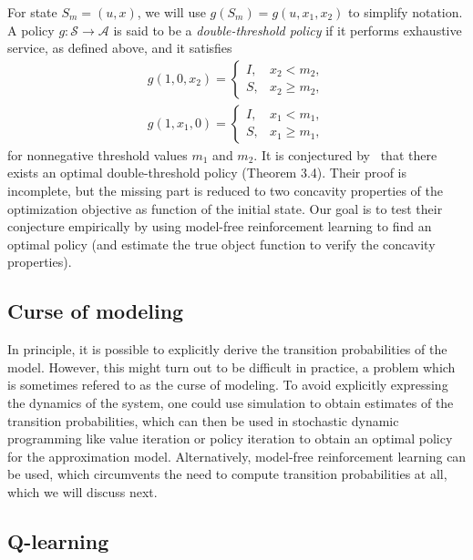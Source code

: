 \documentclass{article}
\theoremstyle{definition}
\theoremstyle{plain}
\begin{document}
For state $S_{m} = (u, x)$, we will use $g(S_{m}) = g(u, x_{1}, x_{2})$ to
simplify notation. A policy $g : \mathcal{S} \rightarrow \mathcal{A}$ is said to
be a \textit{double-threshold policy} if it performs exhaustive service, as
defined above, and it satisfies
\begin{align}
  g(1, 0, x_{2}) = \begin{cases}
                     I, & x_{2} < m_{2} , \\
                     S, & x_{2} \geq m_{2} ,
                    \end{cases}
\end{align}
\begin{align}
  g(1, x_{1}, 0) = \begin{cases}
                     I, & x_{1} < m_{1} , \\
                     S, & x_{1} \geq m_{1} ,
                    \end{cases}
\end{align}
for nonnegative threshold values $m_{1}$ and $m_{2}$. It is conjectured
by~\cite{hofriOptimalControlTwo1987} that there exists an optimal
double-threshold policy (Theorem 3.4). Their proof is incomplete, but the
missing part is reduced to two concavity properties of the optimization
objective as function of the initial state. Our goal is to test their conjecture
empirically by using model-free reinforcement learning to find an optimal policy
(and estimate the true object function to verify the concavity properties).


\subsection{Curse of modeling}

In principle, it is possible to explicitly derive the transition probabilities
of the model. However, this might turn out to be difficult in practice, a
problem which is sometimes refered to as the curse of modeling. To avoid
explicitly expressing the dynamics of the system, one could use simulation to
obtain estimates of the transition probabilities, which can then be used in
stochastic dynamic programming like value iteration or policy iteration to
obtain an optimal policy for the approximation model.
%
Alternatively, model-free reinforcement learning can be used, which circumvents
the need to compute transition probabilities at all, which we will discuss next.

\subsection{Q-learning}
\end{document}
